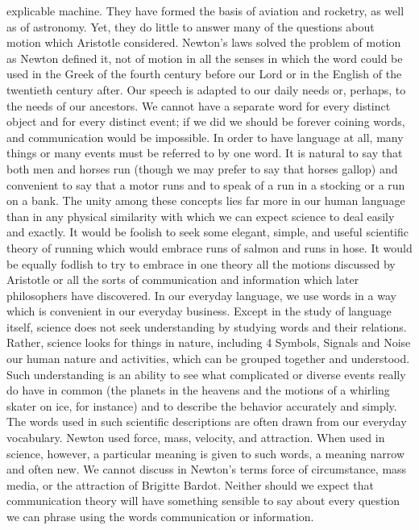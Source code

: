 explicable machine. They have formed the basis of aviation and
rocketry, as well as of astronomy. Yet, they do little to answer many
of the questions about motion which Aristotle considered. Newton’s
laws solved the problem of motion as Newton defined it,
not of motion in all the senses in which the word could be used in
the Greek of the fourth century before our Lord or in the English
of the twentieth century after.
Our speech is adapted to our daily needs or, perhaps, to the needs
of our ancestors. We cannot have a separate word for every distinct
object and for every distinct event; if we did we should be forever
coining words, and communication would be impossible. In order
to have language at all, many things or many events must be
referred to by one word. It is natural to say that both men and
horses run (though we may prefer to say that horses gallop) and
convenient to say that a motor runs and to speak of a run in a
stocking or a run on a bank.
The unity among these concepts lies far more in our human
language than in any physical similarity with which we can expect
science to deal easily and exactly. It would be foolish to seek some
elegant, simple, and useful scientific theory of running which would
embrace runs of salmon and runs in hose. It would be equally
fodlish to try to embrace in one theory all the motions discussed
by Aristotle or all the sorts of communication and information
which later philosophers have discovered.
In our everyday language, we use words in a way which is convenient
in our everyday business. Except in the study of language
itself, science does not seek understanding by studying words and
their relations. Rather, science looks for things in nature, including
4
Symbols, Signals and Noise
our human nature and activities, which can be grouped together
and understood. Such understanding is an ability to see what
complicated or diverse events really do have in common (the
planets in the heavens and the motions of a whirling skater on ice,
for instance) and to describe the behavior accurately and simply.
The words used in such scientific descriptions are often drawn
from our everyday vocabulary. Newton used force, mass, velocity,
and attraction. When used in science, however, a particular meaning
is given to such words, a meaning narrow and often new. We
cannot discuss in Newton’s terms force of circumstance, mass
media, or the attraction of Brigitte Bardot. Neither should we
expect that communication theory will have something sensible to
say about every question we can phrase using the words communication
or information.
